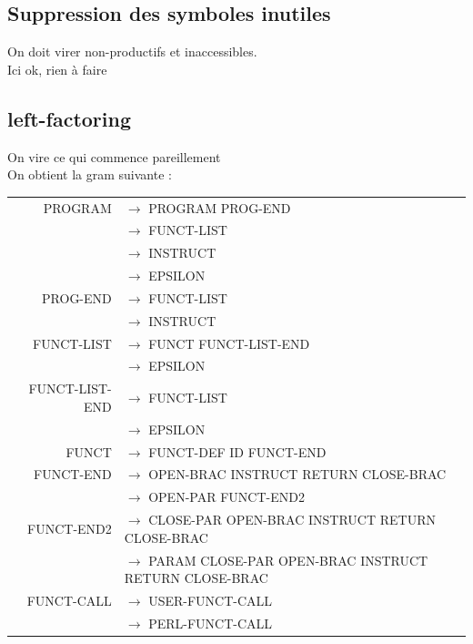 \documentclass[a4paper,10pt]{article}
\begin{document}
\subsection{Suppression des symboles inutiles}
On doit virer non-productifs et inaccessibles.\\
Ici ok, rien à faire







\subsection{left-factoring}
On vire ce qui commence pareillement~\\

On obtient la gram suivante : 

\hspace{-3.5cm}\begin{tabular}{rl}
PROGRAM				& $\rightarrow$ PROGRAM PROG-END \\
					& $\rightarrow$ FUNCT-LIST\\
					& $\rightarrow$ INSTRUCT\\
					& $\rightarrow$ EPSILON\\
PROG-END			& $\rightarrow$ FUNCT-LIST\\
					& $\rightarrow$ INSTRUCT\\
					
FUNCT-LIST			& $\rightarrow$ FUNCT FUNCT-LIST-END\\
					& $\rightarrow$ EPSILON\\
					
FUNCT-LIST-END		& $\rightarrow$ FUNCT-LIST\\
					& $\rightarrow$ EPSILON\\
					
FUNCT				& $\rightarrow$ FUNCT-DEF ID FUNCT-END \\

FUNCT-END			& $\rightarrow$ OPEN-BRAC INSTRUCT RETURN CLOSE-BRAC \\
					& $\rightarrow$ OPEN-PAR FUNCT-END2 \\

FUNCT-END2			& $\rightarrow$ CLOSE-PAR OPEN-BRAC INSTRUCT RETURN CLOSE-BRAC \\
					& $\rightarrow$ PARAM CLOSE-PAR OPEN-BRAC INSTRUCT RETURN CLOSE-BRAC \\

FUNCT-CALL			& $\rightarrow$ USER-FUNCT-CALL \\
					& $\rightarrow$ PERL-FUNCT-CALL \\


\end{tabular}
\end{document}
